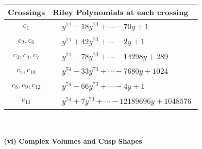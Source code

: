 \documentclass[1p]{elsarticle_modified}
\theoremstyle{definition}
\begin{document}
\begin{tabular}{m{50pt}|m{274pt}}
Crossings & \hspace{64pt}Riley Polynomials at each crossing \\
\hline $$\begin{aligned}c_{1}\end{aligned}$$&$\begin{aligned}
&y^{74}-18 y^{73}+\cdots-70 y+1
\end{aligned}$\\
\hline $$\begin{aligned}c_{2},c_{6}\end{aligned}$$&$\begin{aligned}
&y^{74}+42 y^{73}+\cdots-2 y+1
\end{aligned}$\\
\hline $$\begin{aligned}c_{3},c_{4},c_{7}\end{aligned}$$&$\begin{aligned}
&y^{74}-78 y^{73}+\cdots-14298 y+289
\end{aligned}$\\
\hline $$\begin{aligned}c_{5},c_{10}\end{aligned}$$&$\begin{aligned}
&y^{74}-33 y^{73}+\cdots-7680 y+1024
\end{aligned}$\\
\hline $$\begin{aligned}c_{8},c_{9},c_{12}\end{aligned}$$&$\begin{aligned}
&y^{74}-66 y^{73}+\cdots-4 y+1
\end{aligned}$\\
\hline $$\begin{aligned}c_{11}\end{aligned}$$&$\begin{aligned}
&y^{74}+7 y^{73}+\cdots-12189696 y+1048576
\end{aligned}$\\
\hline
\end{tabular}\\~\\
\newpage\flushleft \textbf{(vi) Complex Volumes and Cusp Shapes}
\end{document}
